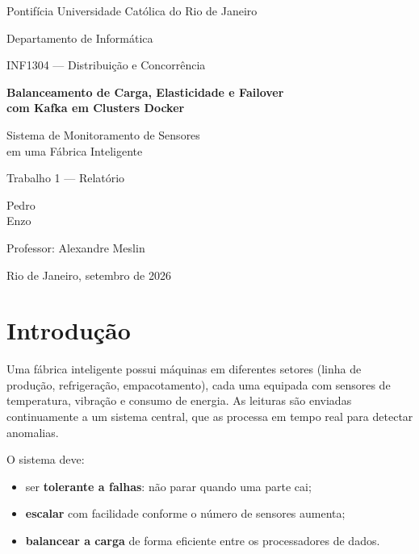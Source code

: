 \documentclass[11pt,a4paper]{article}
\begin{document}
\begin{titlepage}
  \centering
  {\large Pontifícia Universidade Católica do Rio de Janeiro\par}
  {\large Departamento de Informática\par}
  \vspace{0.5cm}
  {\large INF1304 --- Distribuição e Concorrência\par}
  \vspace{3cm}
  {\LARGE\bfseries Balanceamento de Carga, Elasticidade e Failover\\[4pt]
   com Kafka em Clusters Docker\par}
  \vspace{0.8cm}
  {\Large Sistema de Monitoramento de Sensores\\ em uma Fábrica Inteligente\par}
  \vspace{0.8cm}
  {\large Trabalho 1 --- Relatório\par}
  \vfill
  {\large Pedro \\ Enzo\par}
  \vspace{1cm}
  {\large Professor: Alexandre Meslin\par}
  \vspace{0.5cm}
  {\large Rio de Janeiro, setembro de 2026\par}
\end{titlepage}

\tableofcontents
\newpage

\section{Introdução}

Uma fábrica inteligente possui máquinas em diferentes setores (linha de
produção, refrigeração, empacotamento), cada uma equipada com sensores de
temperatura, vibração e consumo de energia. As leituras são enviadas
continuamente a um sistema central, que as processa em tempo real para
detectar anomalias.

O sistema deve:
\begin{itemize}
  \item ser \textbf{tolerante a falhas}: não parar quando uma parte cai;
  \item \textbf{escalar} com facilidade conforme o número de sensores aumenta;
  \item \textbf{balancear a carga} de forma eficiente entre os processadores de dados.
\end{itemize}
\end{document}
